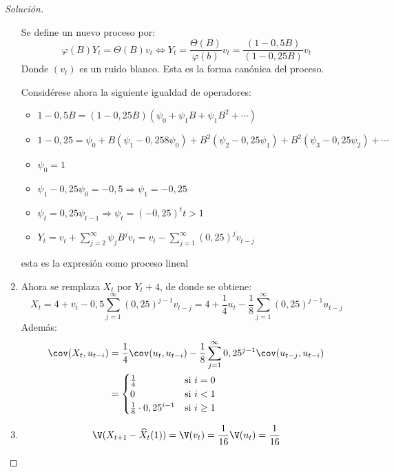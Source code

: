 \begin{ejemplo}
\begin{proof}[Soluci\'{o}n]
\begin{enumerate}
Se define un nuevo proceso por: 
\[
\varphi (B) Y_{t} =\Theta (B)v_{t} \Longleftrightarrow  Y_{t} =\frac{\Theta 
(B)}{\varphi (b)}v_{t} =\frac{(1-0,5B)}{(1-0,25B)}v_{t} 
\]
Donde $(v_{{t}})$ es un ruido blanco. Esta es la forma can\'{o}nica 
del proceso.

Consid\'{e}rese ahora la siguiente igualdad de operadores:
\begin{itemize}
 \item $1-0,5B=(1-0,25B)(\psi_{0} +\psi_{1} B+\psi_{1} B^{2}+\cdots)$
 \item $1-0,25=\psi_{0} +B(\psi_{1} -0,258\psi_{0} )+B^{2}(\psi_{2} -0,25\psi_{1})+B^{2}(\psi_{3} -0,25\psi_{2} )+\cdots$ 
 \item $\psi_{0} =1$
 \item $\psi_{1} -0,25\psi_{0} =-0,5\Rightarrow \psi_{1} =-0,25$
 \item $\psi_{t} =0,25\psi_{t-1}  \Longrightarrow \psi_{t} =(-0,25)^{t}t>1 $
 \item $Y_{t} =v_{t} +\sum_{j=2}^\infty {\psi_{j} B^{j}v_{t} } =v_{t} -\sum_{j=1}^\infty {(0,25)^{j}v_{t-j} }  $
\end{itemize}
esta es la expresi\'{o}n como proceso lineal


\item Ahora se remplaza $X_{t}$   por  $Y_{t} +4$, de donde se obtiene:
\[
X_{t} =4+v_{t} -0,5\sum_{j=1}^\infty {(0,25)^{j-1}v_{t-j} } 
=4+\frac{1}{4}u_{t} -\frac{1}{8}\sum_{j=1}^\infty 
{(0,25)^{j-1}u_{t-j} } 
\]
Adem\'{a}s: 
\begin{align*}
\cov(X_{t} ,u_{t-i} )
	&=\frac{1}{4}\cov(u_{t} ,u_{t-i})-\frac{1}{8}\sum_{j=1}^\infty {0,25^{j-1}} \cov(u_{t-j} ,u_{t-i} )\\
	&=\begin{cases}
	   \frac{1}{4} &\text{si } i=0\\
	   0 &\text{si } i<1\\
	   \frac{1}{8}\cdot 0,25^{i-1} &\text{si } i\ge 1
	  \end{cases}
\end{align*}

\item 
\[
\V(X_{t+1} -\widehat{X}_{t} (1))=\V(v_{t} 
)=\frac{1}{16}\V(u_{t} )=\frac{1}{16}
\]
\end{enumerate}
\end{proof}
\end{ejemplo}


